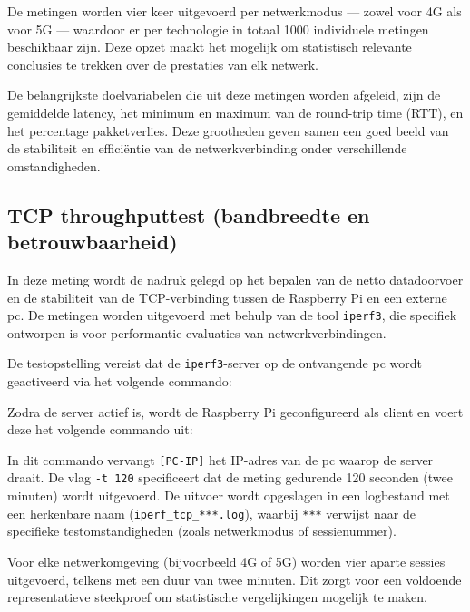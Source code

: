 De metingen worden vier keer uitgevoerd per netwerkmodus — zowel voor 4G als voor 5G — waardoor er per technologie in totaal 1000 individuele metingen beschikbaar zijn. Deze opzet maakt het mogelijk om statistisch relevante conclusies te trekken over de prestaties van elk netwerk.

De belangrijkste doelvariabelen die uit deze metingen worden afgeleid, zijn de gemiddelde latency, het minimum en maximum van de round-trip time (RTT), en het percentage pakketverlies. Deze grootheden geven samen een goed beeld van de stabiliteit en efficiëntie van de netwerkverbinding onder verschillende omstandigheden.


\subsection{TCP throughputtest (bandbreedte en betrouwbaarheid)}
In deze meting wordt de nadruk gelegd op het bepalen van de netto datadoorvoer en de stabiliteit van de TCP-verbinding tussen de Raspberry Pi en een externe pc. De metingen worden uitgevoerd met behulp van de tool \texttt{iperf3}, die specifiek ontworpen is voor performantie-evaluaties van netwerkverbindingen.

De testopstelling vereist dat de \texttt{iperf3}-server op de ontvangende pc wordt geactiveerd via het volgende commando:


Zodra de server actief is, wordt de Raspberry Pi geconfigureerd als client en voert deze het volgende commando uit:


In dit commando vervangt \texttt{[PC-IP]} het IP-adres van de pc waarop de server draait. De vlag \texttt{-t 120} specificeert dat de meting gedurende 120 seconden (twee minuten) wordt uitgevoerd. De uitvoer wordt opgeslagen in een logbestand met een herkenbare naam (\texttt{iperf\_tcp\_***.log}), waarbij \texttt{***} verwijst naar de specifieke testomstandigheden (zoals netwerkmodus of sessienummer).

Voor elke netwerkomgeving (bijvoorbeeld 4G of 5G) worden vier aparte sessies uitgevoerd, telkens met een duur van twee minuten. Dit zorgt voor een voldoende representatieve steekproef om statistische vergelijkingen mogelijk te maken.

